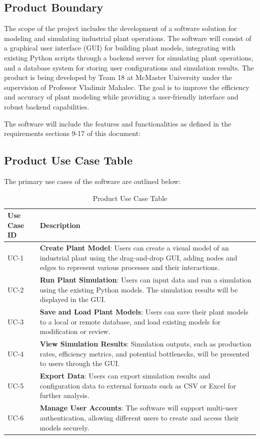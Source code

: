 \documentclass[12pt]{article}
\begin{document}
\subsection{Product Boundary}
The scope of the project includes the development of a software solution for modeling and simulating industrial plant operations. The software will consist of a graphical user interface (GUI) for building plant models, integrating with existing Python scripts through a backend server for simulating plant operations, and a database system for storing user configurations and simulation results. The product is being developed by Team 18 at McMaster University under the supervision of Professor Vladimir Mahalec. The goal is to improve the efficiency and accuracy of plant modeling while providing a user-friendly interface and robust backend capabilities.

The software will include the features and functionalities as defined in the requirements sections 9-17 of this document:

\subsection{Product Use Case Table}
The primary use cases of the software are outlined below:

\begin{table}[htbp!]
  \centering
  \begin{tabularx}{\textwidth}{|l|X|}
  \hline
  \textbf{Use Case ID} & \textbf{Description} \\ \hline
  UC-1 & \textbf{Create Plant Model}: Users can create a visual model of an industrial plant using the drag-and-drop GUI, adding nodes and edges to represent various processes and their interactions. \\ \hline
  UC-2 & \textbf{Run Plant Simulation}: Users can input data and run a simulation using the existing Python models. The simulation results will be displayed in the GUI. \\ \hline
  UC-3 & \textbf{Save and Load Plant Models}: Users can save their plant models to a local or remote database, and load existing models for modification or review. \\ \hline
  UC-4 & \textbf{View Simulation Results}: Simulation outputs, such as production rates, efficiency metrics, and potential bottlenecks, will be presented to users through the GUI. \\ \hline
  UC-5 & \textbf{Export Data}: Users can export simulation results and configuration data to external formats such as CSV or Excel for further analysis. \\ \hline
  UC-6 & \textbf{Manage User Accounts}: The software will support multi-user authentication, allowing different users to create and access their models securely. \\ \hline
  \end{tabularx}
  \caption{Product Use Case Table}
  \end{table}
\end{document}
